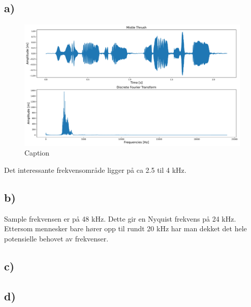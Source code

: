 \documentclass{article}
\begin{document}
\subsection*{a)}
\begin{figure}[h!]
  \centering
  \includegraphics[width = \textwidth]{fig/3.a.pdf}
  \caption{Caption}
  \label{fig: 3.a}
\end{figure}
Det interessante frekvensområde ligger på ca 2.5 til 4 kHz. 
\subsection*{b)}
Sample frekvensen er på 48 kHz. Dette gir en Nyquist frekvens på 24 kHz. Ettersom mennesker bare hører opp til rundt 20 kHz har man dekket det hele potensielle behovet av frekvenser.

\subsection*{c)}

\subsection*{d)}
\end{document}
